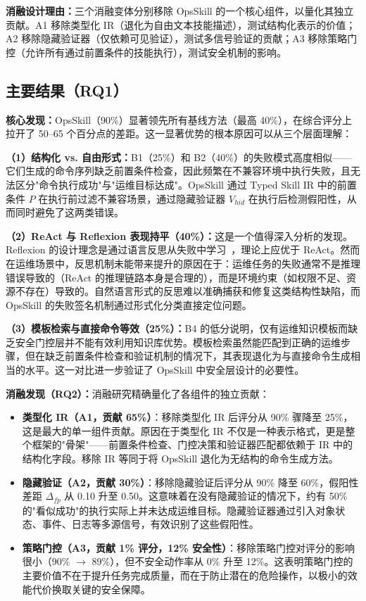 \documentclass[11pt,a4paper]{ctexart}
\begin{document}
\noindent\textbf{消融设计理由：}三个消融变体分别移除 OpsSkill 的一个核心组件，以量化其独立贡献。A1 移除类型化 IR（退化为自由文本技能描述），测试结构化表示的价值；A2 移除隐藏验证器（仅依赖可见验证），测试多信号验证的贡献；A3 移除策略门控（允许所有通过前置条件的技能执行），测试安全机制的影响。

\subsection{主要结果（RQ1）}



\noindent\textbf{核心发现：}OpsSkill（90\%）显著领先所有基线方法（最高 40\%），在综合评分上拉开了 50--65 个百分点的差距。这一显著优势的根本原因可以从三个层面理解：

\textbf{（1）结构化 vs. 自由形式：}B1（25\%）和 B2（40\%）的失败模式高度相似——它们生成的命令序列缺乏前置条件检查，因此频繁在不兼容环境中执行失败，且无法区分"命令执行成功"与"运维目标达成"。OpsSkill 通过 Typed Skill IR 中的前置条件 $P$ 在执行前过滤不兼容场景，通过隐藏验证器 $V_{hid}$ 在执行后检测假阳性，从而同时避免了这两类错误。

\textbf{（2）ReAct 与 Reflexion 表现持平（40\%）：}这是一个值得深入分析的发现。Reflexion 的设计理念是通过语言反思从失败中学习~\cite{shinn2023reflexion}，理论上应优于 ReAct。然而在运维场景中，反思机制未能带来提升的原因在于：运维任务的失败通常不是推理错误导致的（ReAct 的推理链路本身是合理的），而是环境约束（如权限不足、资源不存在）导致的。自然语言形式的反思难以准确捕获和修复这类结构性缺陷，而 OpsSkill 的失败签名机制通过形式化分类直接定位问题。

\textbf{（3）模板检索与直接命令等效（25\%）：}B4 的低分说明，仅有运维知识模板而缺乏安全门控层并不能有效利用知识库优势。模板检索虽然能匹配到正确的运维步骤，但在缺乏前置条件检查和验证机制的情况下，其表现退化为与直接命令生成相当的水平。这一对比进一步验证了 OpsSkill 中安全层设计的必要性。



\noindent\textbf{消融发现（RQ2）：}消融研究精确量化了各组件的独立贡献：

\begin{itemize}[leftmargin=2em]
  \item \textbf{类型化 IR（A1，贡献 65\%）}：移除类型化 IR 后评分从 90\% 骤降至 25\%，这是最大的单一组件贡献。原因在于类型化 IR 不仅是一种表示格式，更是整个框架的"骨架"——前置条件检查、门控决策和验证器匹配都依赖于 IR 中的结构化字段。移除 IR 等同于将 OpsSkill 退化为无结构的命令生成方法。
  \item \textbf{隐藏验证（A2，贡献 30\%）}：移除隐藏验证后评分从 90\% 降至 60\%，假阳性差距 $\Delta_{fp}$ 从 0.10 升至 0.50。这意味着在没有隐藏验证的情况下，约有 50\% 的"看似成功"的执行实际上并未达成运维目标。隐藏验证器通过引入对象状态、事件、日志等多源信号，有效识别了这些假阳性。
  \item \textbf{策略门控（A3，贡献 1\% 评分，12\% 安全性）}：移除策略门控对评分的影响很小（90\% $\to$ 89\%），但不安全动作率从 0\% 升至 12\%。这表明策略门控的主要价值不在于提升任务完成质量，而在于防止潜在的危险操作，以极小的效能代价换取关键的安全保障。
\end{itemize}
\end{document}
